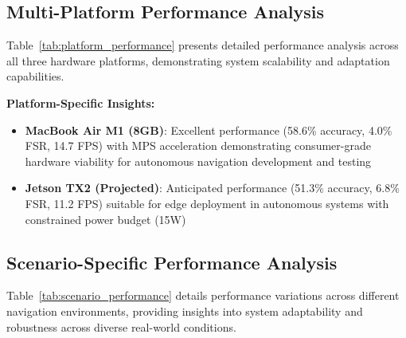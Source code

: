 \documentclass[10pt]{article}
\newcommand{\tabref}[1]{Table~\ref{#1}}
\begin{document}
\subsection{Multi-Platform Performance Analysis}

\tabref{tab:platform_performance} presents detailed performance analysis across all three hardware platforms, demonstrating system scalability and adaptation capabilities.

\begin{table}[ht]
\centering
\caption{Multi-Platform Performance Comparison}
\label{tab:platform_performance}
\end{table}

\textbf{Platform-Specific Insights:}
\begin{itemize}
\item \textbf{MacBook Air M1 (8GB)}: Excellent performance (58.6\% accuracy, 4.0\% FSR, 14.7 FPS) with MPS acceleration demonstrating consumer-grade hardware viability for autonomous navigation development and testing
\item \textbf{Jetson TX2 (Projected)}: Anticipated performance (51.3\% accuracy, 6.8\% FSR, 11.2 FPS) suitable for edge deployment in autonomous systems with constrained power budget (15W)
\end{itemize}

\subsection{Scenario-Specific Performance Analysis}

\tabref{tab:scenario_performance} details performance variations across different navigation environments, providing insights into system adaptability and robustness across diverse real-world conditions.
\end{document}
